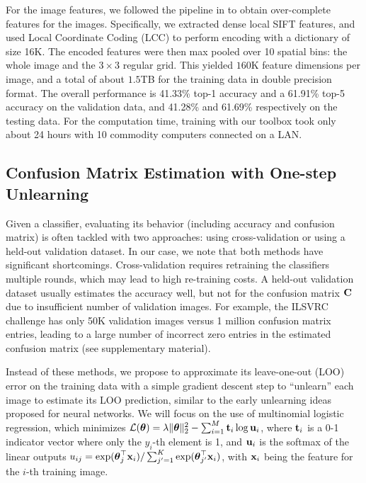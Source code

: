 For the image features, we followed the pipeline in \cite{lin2011large} to obtain over-complete features for the images. Specifically, we extracted dense local SIFT features, and used Local Coordinate Coding (LCC) to perform encoding with a dictionary of size 16K. The encoded features were then max pooled over 10 spatial bins: the whole image and the $3\times 3$ regular grid. This yielded $160$K feature dimensions per image, and a total of about $1.5$TB for the training data in double precision format. The overall performance is 41.33\% top-1 accuracy and a 61.91\% top-5 accuracy on the validation data, and 41.28\% and 61.69\% respectively on the testing data. For the computation time, training with our toolbox took only about 24 hours with 10 commodity computers connected on a LAN.

\subsection{Confusion Matrix Estimation with One-step Unlearning}
Given a classifier, evaluating its behavior (including accuracy and confusion matrix) is often tackled with two approaches: using cross-validation or using a held-out validation dataset. In our case, we note that both methods have significant shortcomings. Cross-validation requires retraining the classifiers multiple rounds, which may lead to high re-training costs. A held-out validation dataset usually estimates the accuracy well, but not for the confusion matrix $\mathbf{C}$ due to insufficient number of validation images. For example, the ILSVRC challenge has only 50K validation images versus 1 million confusion matrix entries, leading to a large number of incorrect zero entries in the estimated confusion matrix (see supplementary material).

Instead of these methods, we propose to approximate its leave-one-out (LOO) error on the training data with a simple gradient descent step to ``unlearn'' each image to estimate its LOO prediction, similar to the early unlearning ideas \cite{hansen1996linear} proposed for neural networks. We will focus on the use of multinomial logistic regression, which minimizes $\mathcal{L}(\boldsymbol{\theta}) = \lambda \|\boldsymbol{\theta}\|_2^2 - \sum\nolimits_{i=1}^{M}\mathbf{t}_i \log \mathbf{u}_{i}$, where $\mathbf{t}_i$ is a 0-1 indicator vector where only the $y_i$-th element is 1, and $\mathbf{u}_i$ is the softmax of the linear outputs $u_{ij} = \exp(\boldsymbol{\theta}_j^\top\mathbf{x}_i) / \sum\nolimits_{j'=1}^{K}\exp(\boldsymbol{\theta}_{j'}^\top\mathbf{x}_i)$, with $\mathbf{x}_i$ being the feature for the $i$-th training image.

